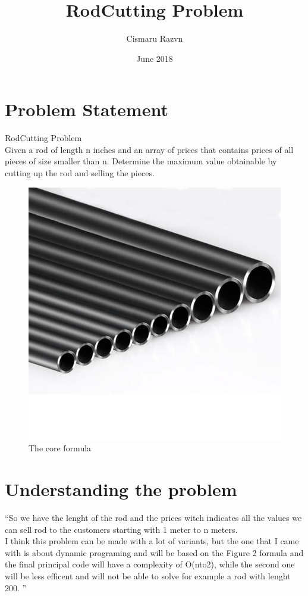 \documentclass{article}
\title{RodCutting Problem}
\author{Cismaru Razvn}
\date{June 2018}
\begin{document}
\maketitle

\section{Problem Statement}
RodCutting Problem\\ Given a rod of length n inches and an array of prices that contains prices of all pieces of size smaller than n. Determine the maximum value obtainable by cutting up the rod and selling the pieces. 
\\

\begin{figure}[h!]
\centering
\includegraphics[scale=0.4]{teava.jpg}
\caption{The core formula}
\label{fig:universe}
\end{figure}

\section{Understanding the problem}
``So we have the lenght of the rod and the prices witch indicates all the values we can sell rod to the customers starting with 1 meter to n meters.
\\ I think this problem can be made with a lot of variants, but the one that I came with is about dynamic programing and will be based on the Figure 2 formula and the final principal code will have a complexity of O(nto2),  while the second one will be less efficent and will not be able to solve for example a rod with lenght 200. '' 
\end{document}
